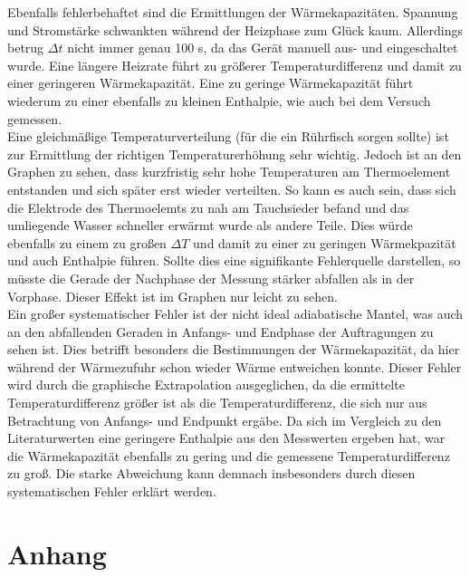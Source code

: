 \documentclass[12pt,a4paper,titlepage,headinclude,bibtotoc]{scrartcl}
\begin{document}
Ebenfalls fehlerbehaftet sind die Ermittlungen der Wärmekapazitäten. Spannung und Stromstärke schwankten während der Heizphase zum Glück kaum. Allerdings betrug $\Delta t$ nicht immer genau 100 s, da das Gerät manuell aus- und eingeschaltet wurde. Eine längere Heizrate führt zu größerer Temperaturdifferenz und damit zu einer geringeren Wärmekapazität. Eine zu geringe Wärmekapazität führt wiederum zu einer ebenfalls zu kleinen Enthalpie, wie auch bei dem Versuch gemessen.\\

Eine gleichmäßige Temperaturverteilung (für die ein Rührfisch sorgen sollte) ist zur Ermittlung der richtigen Temperaturerhöhung sehr wichtig. Jedoch ist an den Graphen zu sehen, dass kurzfristig sehr hohe Temperaturen am Thermoelement entstanden und sich später erst wieder verteilten. So kann es auch sein, dass sich die Elektrode des Thermoelemts zu nah am Tauchsieder befand und das umliegende Wasser schneller erwärmt wurde als andere Teile. Dies würde ebenfalls zu einem zu großen $\Delta T$ und damit zu einer zu geringen Wärmekpazität und auch Enthalpie führen. Sollte dies eine signifikante Fehlerquelle darstellen, so müsste die Gerade der Nachphase der Messung stärker abfallen als in der Vorphase. Dieser Effekt ist im Graphen nur leicht zu sehen.\\

Ein großer systematischer Fehler ist der nicht ideal adiabatische Mantel, was auch an den abfallenden Geraden in Anfangs- und Endphase der Auftragungen zu sehen ist. Dies betrifft besonders die Bestimmungen der Wärmekapazität, da hier während der Wärmezufuhr schon wieder Wärme entweichen konnte. Dieser Fehler wird durch die graphische Extrapolation ausgeglichen, da die ermittelte Temperaturdifferenz größer ist als die Temperaturdifferenz, die sich nur aus Betrachtung von Anfangs- und Endpunkt ergäbe. 
Da sich im Vergleich zu den Literaturwerten eine geringere Enthalpie aus den Messwerten ergeben hat, war die Wärmekapazität ebenfalls zu gering und die gemessene Temperaturdifferenz zu groß. Die starke Abweichung kann demnach insbesonders durch diesen systematischen Fehler erklärt werden.\\


\newpage

\section{Anhang}
\end{document}
